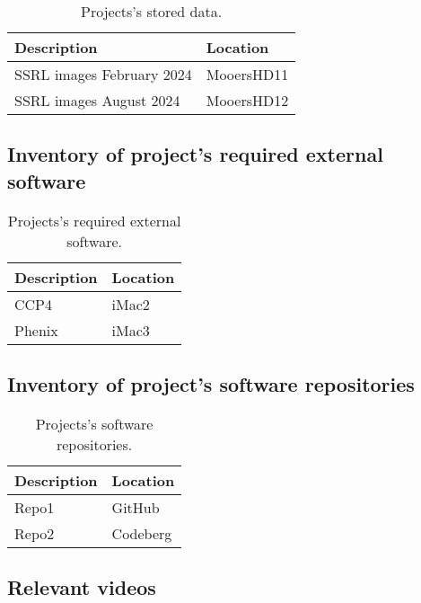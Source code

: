 \documentclass[11pt,letterpaper]{article}
\begin{document}
\begin{table}[htbp]
\caption[Stored data]{Projects's stored data.}
\centering
\begin{tabular}{ll}
Description & Location\\[0pt]
\hline
SSRL images February 2024 & MooersHD11\\[0pt]
SSRL images August 2024 & MooersHD12\\[0pt]
\end{tabular}
\end{table}



\subsection{Inventory of project's required external software}
\label{sec:org53bfb01}


\begin{table}[htbp]
\caption[External software]{Projects's required external software.}
\centering
\begin{tabular}{ll}
Description & Location\\[0pt]
\hline
CCP4 & iMac2\\[0pt]
Phenix & iMac3\\[0pt]
\end{tabular}
\end{table}



\subsection{Inventory of project's software repositories}
\label{sec:org2cc439e}


\begin{table}[htbp]
\caption[Software repos]{Projects's software repositories.}
\centering
\begin{tabular}{ll}
Description & Location\\[0pt]
\hline
Repo1 & GitHub\\[0pt]
Repo2 & Codeberg\\[0pt]
\end{tabular}
\end{table}



\subsection{Relevant videos}
\label{sec:orgd079f47}
\end{document}
